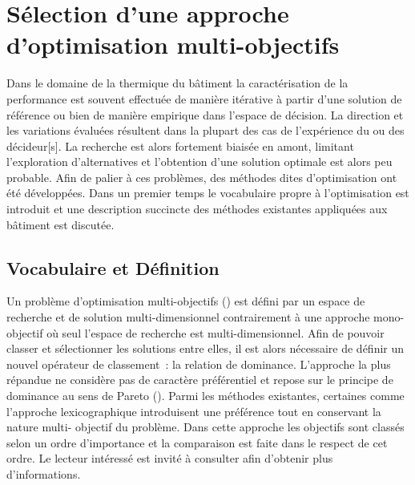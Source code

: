 \section{Sélection d’une approche d’optimisation multi-objectifs} %
\label{sec:selection_d_une_approche_d_optimisation_multi_objectif}
Dans le domaine de la thermique du bâtiment la caractérisation de la performance est
souvent effectuée de manière itérative à partir d’une solution de référence ou bien de
manière empirique dans l’espace de décision. La direction et les variations évaluées
résultent dans la plupart des cas de l’expérience du ou des décideur[s]. La recherche est
alors fortement biaisée en amont, limitant l’exploration d’alternatives et l’obtention
d’une solution optimale est alors peu probable. Afin de palier à ces problèmes, des
méthodes dites d’optimisation ont été développées. Dans un premier temps le vocabulaire
propre à l’optimisation est introduit et une description succincte des méthodes existantes
appliquées aux bâtiment est discutée.



\subsection{Vocabulaire et Définition} %
\label{sub:vocabulaire_et_definition}
Un problème d’optimisation multi-objectifs ()
est défini par un espace de recherche et de solution multi-dimensionnel contrairement à
une approche mono-objectif où seul l’espace de recherche est multi-dimensionnel. Afin de
pouvoir classer et sélectionner les solutions entre elles, il est alors nécessaire de
définir un nouvel opérateur de classement~: la relation de dominance. L’approche la plus
répandue ne considère pas de caractère préférentiel et repose sur le principe de dominance
au sens de Pareto (). Parmi les méthodes
existantes, certaines comme l’approche lexicographique introduisent une préférence tout en
conservant la nature multi- objectif du problème. Dans cette
approche les objectifs sont classés selon un ordre d’importance et la comparaison est
faite dans le respect de cet ordre. Le lecteur intéressé est invité à consulter
\textcite{Collette2002} afin d’obtenir plus d’informations.

